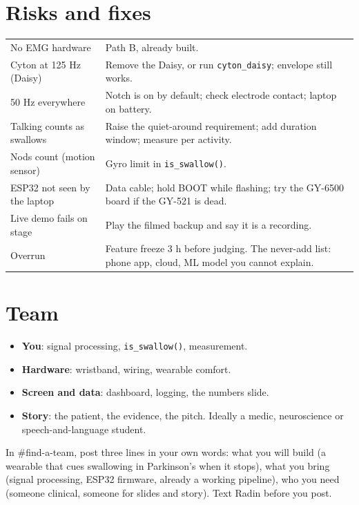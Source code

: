 \documentclass[10.5pt,a4paper]{article}
\newcommand{\f}[1]{\texttt{#1}}
\begin{document}
\section{Risks and fixes}\label{sec:risks}
\begin{tabularx}{\linewidth}{@{}p{5.2cm}L@{}}
\toprule
No EMG hardware & Path B, already built.\\
Cyton at 125 Hz (Daisy) & Remove the Daisy, or run \f{cyton\_daisy}; envelope still works.\\
50 Hz everywhere & Notch is on by default; check electrode contact; laptop on battery.\\
Talking counts as swallows & Raise the quiet-around requirement; add duration window; measure per activity.\\
Nods count (motion sensor) & Gyro limit in \f{is\_swallow()}.\\
ESP32 not seen by the laptop & Data cable; hold BOOT while flashing; try the GY-6500 board if the GY-521 is dead.\\
Live demo fails on stage & Play the filmed backup and say it is a recording.\\
Overrun & Feature freeze 3 h before judging. The never-add list: phone app, cloud, ML model you cannot explain.\\
\bottomrule
\end{tabularx}

\section{Team}\label{sec:team}
\begin{itemize}
\item \textbf{You}: signal processing, \f{is\_swallow()}, measurement.
\item \textbf{Hardware}: wristband, wiring, wearable comfort.
\item \textbf{Screen and data}: dashboard, logging, the numbers slide.
\item \textbf{Story}: the patient, the evidence, the pitch. Ideally a medic, neuroscience or speech-and-language student.
\end{itemize}
In \#find-a-team, post three lines in your own words: what you will build (a wearable that cues swallowing in Parkinson's when it stops), what you bring (signal processing, ESP32 firmware, already a working pipeline), who you need (someone clinical, someone for slides and story). Text Radin before you post.
\end{document}
